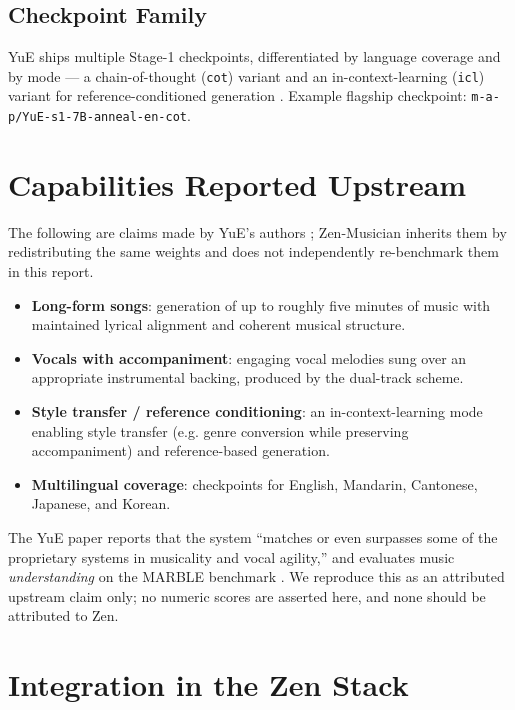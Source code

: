 \documentclass[11pt,a4paper]{article}
\begin{document}
\subsection{Checkpoint Family}

YuE ships multiple Stage-1 checkpoints, differentiated by language coverage and by
mode --- a chain-of-thought (\texttt{cot}) variant and an in-context-learning
(\texttt{icl}) variant for reference-conditioned generation \cite{yuehf}. Example
flagship checkpoint: \texttt{m-a-p/YuE-s1-7B-anneal-en-cot}.

\section{Capabilities Reported Upstream}

The following are claims made by YuE's authors \cite{yuan2025yue}; Zen-Musician
inherits them by redistributing the same weights and does not independently
re-benchmark them in this report.

\begin{itemize}
    \item \textbf{Long-form songs}: generation of up to roughly five minutes of
    music with maintained lyrical alignment and coherent musical structure.
    \item \textbf{Vocals with accompaniment}: engaging vocal melodies sung over an
    appropriate instrumental backing, produced by the dual-track scheme.
    \item \textbf{Style transfer / reference conditioning}: an in-context-learning
    mode enabling style transfer (e.g. genre conversion while preserving
    accompaniment) and reference-based generation.
    \item \textbf{Multilingual coverage}: checkpoints for English, Mandarin,
    Cantonese, Japanese, and Korean.
\end{itemize}

The YuE paper reports that the system ``matches or even surpasses some of the
proprietary systems in musicality and vocal agility,'' and evaluates music
\emph{understanding} on the MARBLE benchmark \cite{yuan2025yue}. We reproduce this
as an attributed upstream claim only; no numeric scores are asserted here, and
none should be attributed to Zen.

\section{Integration in the Zen Stack}
\end{document}
